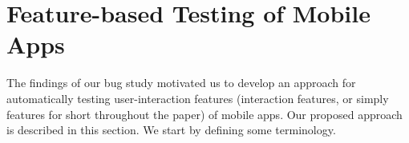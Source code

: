 \section{Feature-based Testing of Mobile Apps}
\label{framework}


The findings of our bug study motivated us to develop an approach for automatically testing user-interaction features (interaction features, or simply features for short throughout the paper) of mobile apps. Our proposed approach is described in this section. We start by defining some terminology.












